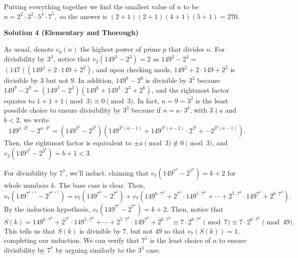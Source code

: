 \begin{enumerate}
 Putting everything together we find the smallest value of $n$ to be $n = 2^2 \cdot 3^2 \cdot 5^4 \cdot 7^5,$ so the answer is $(2+1)(2+1)(4+1)(5+1) = \boxed{270}.$




\textbf{Solution 4 (Elementary and Thorough)}

As usual, denote $v_p(n)$ the highest power of prime $p$ that divides $n$. For divisibility by $3^3$, notice that $v_3(149^3 - 2^3) = 2$ as $149^3 - 2^3 =$ $(147)(149^2 + 2\cdot149 + 2^2)$, and upon checking mods, $149^2 + 2\cdot149 + 2^2$ is divisible by $3$ but not $9$. In addition, $149^9 - 2^9$ is divisible by $3^3$ because $149^9 - 2^9 = (149^3 - 2^3)(149^6 + 149^3\cdot2^3 + 2^6)$, and the rightmost factor equates to $1 + 1 + 1 \pmod{3} \equiv 0 \pmod{3}$. In fact, $n = 9 = 3^2$ is the least possible choice to ensure divisibility by $3^3$ because if $n = a \cdot 3^b$, with $3 \nmid a$ and $b < 2$, we write 
 \[149^{a \cdot 3^b} - 2^{a \cdot 3^b} =  (149^{3^b} - 2^{3^b})(149^{3^b(a - 1)} + 149^{3^b(a - 2)}\cdot2^{3^b}+\cdots2^{3^b(a - 1)}).\] Then, the rightmost factor is equivalent to $\pm a \pmod{3} \not\equiv 0 \pmod{3}$, and $v_3(149^{3^b} - 2^{3^b}) = b + 1 < 3$.

 For divisibility by $7^7$, we'll induct, claiming that $v_7(149^{7^k} - 2^{7^k}) = k + 2$ for whole numbers $k$. The base case is clear. Then, 
 \[v_7(149^{7^{k+1}} - 2^{7^{k+1}}) = v_7(149^{7^k} - 2^{7^k}) + v_7(149^{6\cdot7^k} + 2^{7^k}\cdot149^{5\cdot7^k} + \cdots + 2^{5\cdot7^k}\cdot149^{7^k} + 2^{6\cdot7^k}).\] By the induction hypothesis, $v_7(149^{7^k} - 2^{7^k}) = k + 2$. Then, notice that 
 \[S(k) = 149^{6\cdot7^k} + 2^{7^k}\cdot149^{5\cdot7^k} + \cdots + 2^{5\cdot7^k}\cdot149^{7^k} + 2^{6\cdot7^k} \equiv 7 \cdot 2^{6\cdot7^k}\pmod{7} \equiv 7 \cdot 2^{6\cdot7^k}\pmod{49}.\] This tells us that $S(k)$ is divisible by $7$, but not $49$ so that $v_7\left(S(k)\right) = 1$, completing our induction. We can verify that $7^5$ is the least choice of $n$ to ensure divisibility by $7^7$ by arguing similarly to the $3^3$ case. 


\end{enumerate}
